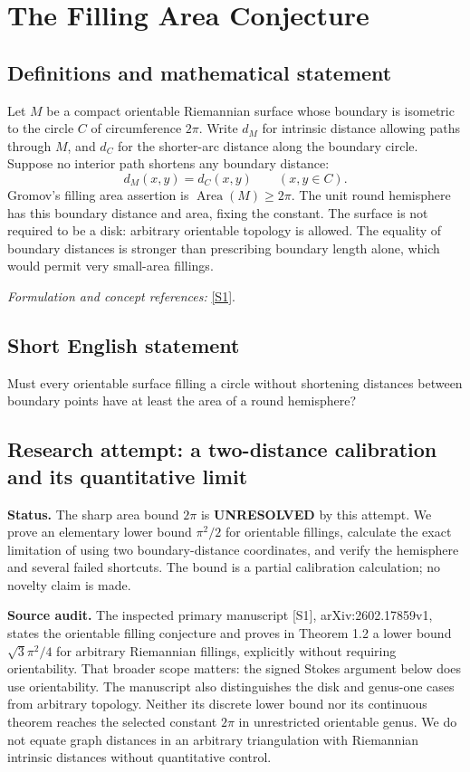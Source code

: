 \documentclass[11pt]{article}
\begin{document}
\section*{\texorpdfstring{The Filling Area Conjecture}{The Filling Area Conjecture}}\label{1209}
\subsection{Definitions and mathematical statement}
Let $M$ be a compact orientable Riemannian surface whose boundary is isometric to the circle $C$ of circumference $2\pi$. Write $d_M$ for intrinsic distance allowing paths through $M$, and $d_C$ for the shorter-arc distance along the boundary circle. Suppose no interior path shortens any boundary distance:
\[
 d_M(x,y)=d_C(x,y)\qquad(x,y\in C).
\]
Gromov's filling area assertion is $\operatorname{Area}(M)\ge2\pi$. The unit round hemisphere has this boundary distance and area, fixing the constant. The surface is not required to be a disk: arbitrary orientable topology is allowed. The equality of boundary distances is stronger than prescribing boundary length alone, which would permit very small-area fillings.
\par\smallskip\textit{Formulation and concept references:} \href{https://arxiv.org/abs/2602.17859}{[S1]}.

\subsection{Short English statement}
Must every orientable surface filling a circle without shortening distances between boundary points have at least the area of a round hemisphere?
\subsection{Research attempt: a two-distance calibration and its quantitative limit}
\textbf{Status.} The sharp area bound $2\pi$ is \textbf{UNRESOLVED} by this attempt. We prove an elementary lower bound $\pi^2/2$ for orientable fillings, calculate the exact limitation of using two boundary-distance coordinates, and verify the hemisphere and several failed shortcuts. The bound is a partial calibration calculation; no novelty claim is made.

\textbf{Source audit.} The inspected primary manuscript [S1], arXiv:2602.17859v1, states the orientable filling conjecture and proves in Theorem 1.2 a lower bound $\sqrt3\pi^2/4$ for arbitrary Riemannian fillings, explicitly without requiring orientability. That broader scope matters: the signed Stokes argument below does use orientability. The manuscript also distinguishes the disk and genus-one cases from arbitrary topology. Neither its discrete lower bound nor its continuous theorem reaches the selected constant $2\pi$ in unrestricted orientable genus. We do not equate graph distances in an arbitrary triangulation with Riemannian intrinsic distances without quantitative control.
\end{document}

